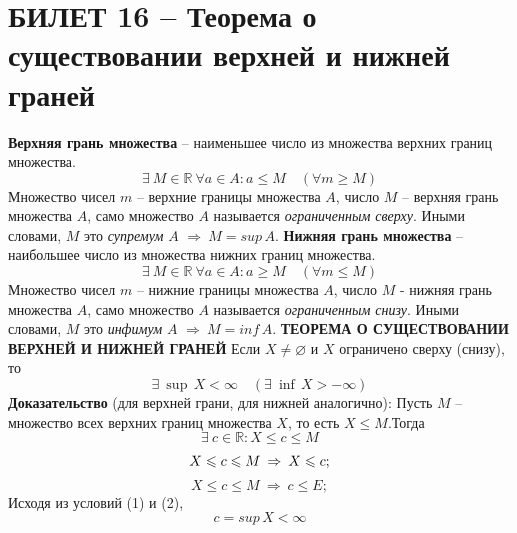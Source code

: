 \documentclass{article}
\newcommand{\R}{\mathbb R}
\begin{document}
\section{БИЛЕТ 16 -- Теорема о существовании верхней и нижней граней}
\textbf{Верхняя грань множества} -- наименьшее число из множества верхних границ множества.
$$ \exists\: M\in\R\:\forall a\in A:a\leqslant M\quad(\forall m\geqslant M) $$
Множество чисел $m$ -- верхние границы множества $A$, число $M$ -- верхняя грань множества $A$, само множество $A$ называется \textit{ограниченным сверху}. Иными словами, $M$ это \textit{супремум} $A$ $\Rightarrow\:M=sup\,A$.
\newline
\newline
\textbf{Нижняя грань множества} -- наибольшее число из множества нижних границ множества.
$$ \exists\: M\in\R\:\forall a\in A:a\geqslant M\quad(\forall m\leqslant M) $$
Множество чисел $m$ -- нижние границы множества $A$, число $M$ - нижняя грань множества $A$, само множество $A$ называется \textit{ограниченным снизу}. Иными словами, $M$ это \textit{инфимум} $A$ $\Rightarrow\:M=inf\,A$.
\newline
\newline
\textbf{ТЕОРЕМА О СУЩЕСТВОВАНИИ ВЕРХНЕЙ И НИЖНЕЙ ГРАНЕЙ}
\newline
Если $X\ne\varnothing$ и $X$ ограничено сверху (снизу), то 
$$ \exists\:\sup\,X<\infty\quad (\exists\:\inf\,X>-\infty) $$
\textbf{Доказательство} (для верхней грани, для нижней аналогично):
\newline
\newline
Пусть $M$ -- множество всех верхних границ множества $X$, то есть $X\leqslant M$.Тогда
$$ \exists \:c\in\R:X\leqslant c\leqslant M $$
\begin{equation}\label{1}
\setcounter{equation}{1}
    X\leqslant c\leqslant M\:\Rightarrow\:X\leqslant c;
\end{equation}
\begin{equation}\label{2}
    X\leqslant c\leqslant M\:\Rightarrow\: c\leqslant E;
\end{equation}
Исходя из условий (1) и (2),
$$ c=sup\,X<\infty $$
\newpage
\end{document}
